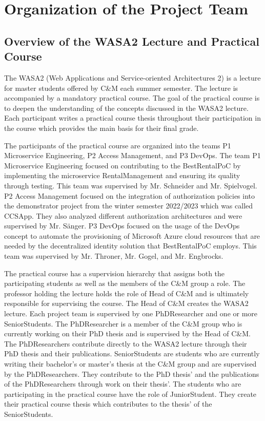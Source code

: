 \chapter{Organization of the Project Team}
\label{cha:projektteam-arbeiten}


\section{Overview of the WASA2 Lecture and Practical Course}

The WASA2 (Web Applications and Service-oriented Architectures 2) is a lecture for master students
offered by C\&M each summer semester. The lecture is accompanied by a mandatory practical course.
The goal of the practical course is to deepen the understanding of the concepts discussed in the WASA2
lecture. Each participant writes a practical course thesis throughout their participation in the course
which provides the main basis for their final grade. 

The participants of the practical course are organized into the teams P1 Microservice Engineering,
P2 Access Management, and P3 DevOps. The team P1 Microservice Engineering focused on contributing
to the BestRentalPoC by implementing the microservice RentalManagement and ensuring its
quality through testing. This team was supervised by Mr. Schneider and Mr. Spielvogel.
P2 Access Management focused on the integration of authorization policies into the demonstrator
project from the winter semester 2022/2023 which was called CCSApp. They also analyzed
different authorization architectures and were supervised by Mr. Sänger.
P3 DevOps focused on the usage of the DevOps concept to automate the provisioning
of Microsoft Azure cloud resources that are needed by the decentralized identity solution
that BestRentalPoC employs. This team was supervised by Mr. Throner, Mr. Gogel, and Mr. Engbrocks.

The practical course has a supervision hierarchy that assigns both the participating students
as well as the members of the C\&M group a role. The professor holding the lecture holds
the role of Head of C\&M and is ultimately responsible for supervising the course.
The Head of C\&M creates the WASA2 lecture.
Each project team is supervised by one PhDResearcher and one or more SeniorStudents.
The PhDResearcher is a member of the C\&M group who is currently working on their PhD thesis and is supervised by the Head of C\&M.
The PhDResearchers contribute directly to the WASA2 lecture through their PhD thesis and their publications.
SeniorStudents are students who are currently writing their bachelor's or master's thesis
at the C\&M group and are supervised by the PhDResearchers. They contribute to the PhD thesis' and the publications of the PhDResearchers
through work on their thesis'.
The students who are participating in the practical course have the role
of JuniorStudent. They create their practical course thesis which contributes
to the thesis' of the SeniorStudents.

